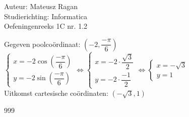 \documentclass[a4paper]{article}
\begin{document}
\noindent \large Auteur: Mateusz Ragan \\
\noindent \large Studierichting: Informatica \\
\noindent \large Oefeningenreeks 1C nr. 1.2 \\

\medskip

\normalsize
Gegeven poolcoördinaat: $\left(-2,\dfrac{-\pi}{6}\right)$ \\

$\left\{\begin{array}{l}
x = -2\cos\left(\dfrac{-\pi}{6}\right) \\
y = -2\sin\left(\dfrac{-\pi}{6}\right)
\end{array}\right.
\Leftrightarrow
\left\{
\begin{array}{l}
x = -2 \cdot \dfrac{\sqrt{3}}{2} \\
y = -2 \cdot \dfrac{-1}{2}
\end{array}\right.
\Leftrightarrow
\left\{
\begin{array}{l}
x = -\sqrt{3} \\
y = 1
\end{array}\right.$ \\

Uitkomst cartesische coördinaten: $(-\sqrt{3}, 1)$

\begin{thebibliography}{999}
\end{thebibliography}
\end{document}
